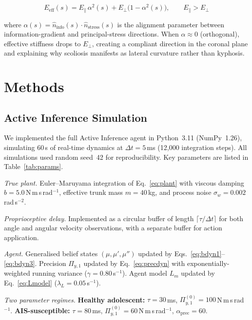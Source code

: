 \documentclass[12pt, letterpaper]{article}
\newcommand{\Piy}{\Pi_{y,1}}
\newcommand{\Lm}{L_m}
\begin{document}
\begin{equation}
  E_{\mathrm{eff}}(s) = E_\parallel\,\alpha^{2}(s)
    + E_\perp\!\bigl(1-\alpha^{2}(s)\bigr),
    \qquad E_\parallel > E_\perp
  \label{eq:Eeff}
\end{equation}

where $\alpha(s) = \hat{n}_{\mathrm{info}}(s)\cdot\hat{n}_{\mathrm{stress}}(s)$
is the alignment parameter between information-gradient and principal-stress
directions. When $\alpha \approx 0$ (orthogonal), effective stiffness drops to
$E_\perp$, creating a compliant direction in the coronal plane and explaining
why scoliosis manifests as lateral curvature rather than kyphosis.

\section{Methods}

\subsection{Active Inference Simulation}

We implemented the full Active Inference agent in Python~3.11 (NumPy~1.26),
simulating 60\,s of real-time dynamics at $\Delta t = 5$\,ms (12,000 integration
steps). All simulations used random seed~42 for reproducibility. Key parameters
are listed in Table~\ref{tab:params}.

\medskip
\noindent\textit{True plant.} Euler--Maruyama integration of Eq.~\eqref{eq:plant}
with viscous damping $b = 5.0$\,N\,m\,s\,rad$^{-1}$, effective trunk mass
$m = 40$\,kg, and process noise $\sigma_w = 0.002$\,rad\,s$^{-2}$.

\medskip
\noindent\textit{Proprioceptive delay.} Implemented as a circular buffer of length
$\lceil\tau/\Delta t\rceil$ for both angle and angular velocity observations,
with a separate buffer for action application.

\medskip
\noindent\textit{Agent.} Generalised belief states $(\mu, \mu', \mu'')$ updated
by Eqs.~\eqref{eq:bdyn1}--\eqref{eq:bdyn3}. Precision $\Piy$ updated by
Eq.~\eqref{eq:precdyn} with exponentially-weighted running variance
($\gamma = 0.80$\,s$^{-1}$). Agent model $\Lm$ updated by Eq.~\eqref{eq:Lmodel}
($\lambda_L = 0.05$\,s$^{-1}$).

\medskip
\noindent\textit{Two parameter regimes.} \textbf{Healthy adolescent:}
$\tau = 30$\,ms, $\Piy^{(0)} = 100$\,N\,m\,s\,rad$^{-1}$.
\textbf{AIS-susceptible:} $\tau = 80$\,ms, $\Piy^{(0)} = 60$\,N\,m\,s\,rad$^{-1}$,
$\alpha_{\mathrm{prec}} = 60$.
\end{document}
